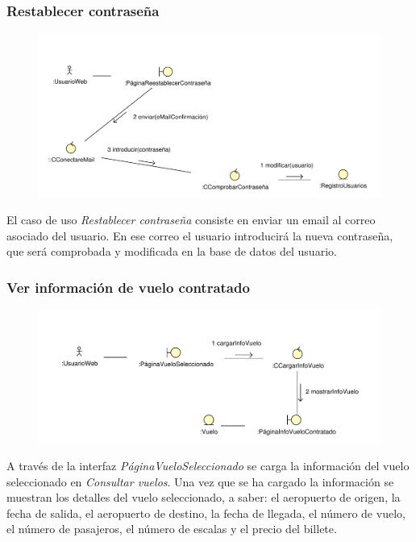 \documentclass[11pt, a4paper, twoside, titlepage]{article}
\begin{document}
			\subsubsection{Restablecer contraseña}
				\begin{figure}[H]\centering
					\includegraphics[scale=.77]{diagramas/restablecercontrasena.pdf}
				\end{figure}

					El caso de uso {\itshape Restablecer contraseña} consiste en enviar un email  al correo asociado del usuario. En ese correo el usuario introducirá la nueva contraseña, que será comprobada y modificada en la base de datos del usuario.

			\subsubsection{Ver información de vuelo contratado}
				\begin{figure}[H]\centering
					\includegraphics[scale=.8]{diagramas/verinfovuelocontratado.pdf}
				\end{figure}
					A través de la interfaz {\itshape PáginaVueloSeleccionado} se carga la información del vuelo seleccionado en  {\itshape Consultar vuelos}. Una vez que se ha cargado la información se muestran los detalles del vuelo seleccionado, a saber: el aeropuerto de origen, la fecha de salida, el aeropuerto de destino, la fecha de llegada, el número de vuelo, el número de pasajeros, el número de escalas y el precio del billete.
\end{document}
